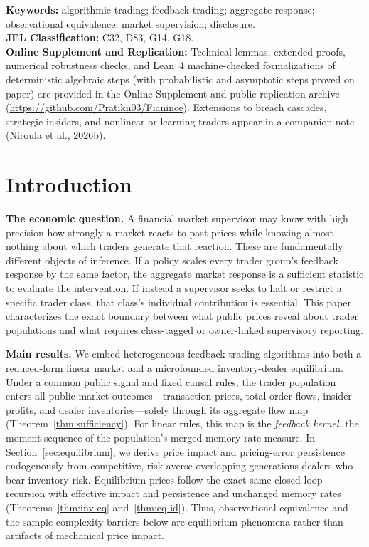 \documentclass[11pt,letterpaper]{article}
\theoremstyle{definition}
\begin{document}
\vspace{0.5em}
\noindent\textbf{Keywords:} algorithmic trading; feedback trading; aggregate response; observational equivalence; market supervision; disclosure.\\
\noindent\textbf{JEL Classification:} C32, D83, G14, G18.\\
\noindent\textbf{Online Supplement and Replication:} Technical lemmas, extended proofs, numerical robustness checks, and Lean~4 machine-checked formalizations of deterministic algebraic steps (with probabilistic and asymptotic steps proved on paper) are provided in the Online Supplement and public replication archive (\url{https://github.com/Pratikn03/Fianince}). Extensions to breach cascades, strategic insiders, and nonlinear or learning traders appear in a companion note (Niroula et al., 2026b).

\newpage
\setcounter{page}{1}

\section{Introduction}

\textbf{The economic question.} A financial market supervisor may know with high precision how strongly a market reacts to past prices while knowing almost nothing about which traders generate that reaction. These are fundamentally different objects of inference. If a policy scales every trader group's feedback response by the same factor, the aggregate market response is a sufficient statistic to evaluate the intervention. If instead a supervisor seeks to halt or restrict a specific trader class, that class's individual contribution is essential. This paper characterizes the exact boundary between what public prices reveal about trader populations and what requires class-tagged or owner-linked supervisory reporting.

\textbf{Main results.} We embed heterogeneous feedback-trading algorithms into both a reduced-form linear market and a microfounded inventory-dealer equilibrium. Under a common public signal and fixed causal rules, the trader population enters all public market outcomes—transaction prices, total order flows, insider profits, and dealer inventories—solely through its aggregate flow map (Theorem~\ref{thm:sufficiency}). For linear rules, this map is the \emph{feedback kernel}, the moment sequence of the population's merged memory-rate measure. In Section~\ref{sec:equilibrium}, we derive price impact and pricing-error persistence endogenously from competitive, risk-averse overlapping-generations dealers who bear inventory risk. Equilibrium prices follow the exact same closed-loop recursion with effective impact and persistence and unchanged memory rates (Theorems~\ref{thm:inv-eq} and~\ref{thm:eq-id}). Thus, observational equivalence and the sample-complexity barriers below are equilibrium phenomena rather than artifacts of mechanical price impact.
\end{document}
